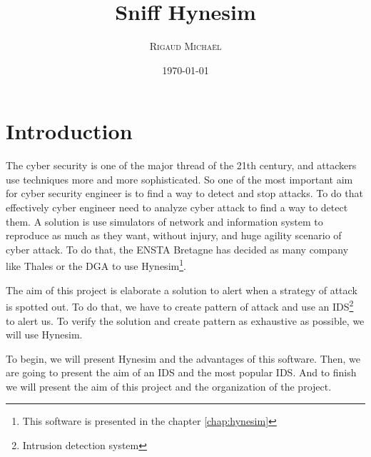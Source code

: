 \documentclass[a4paper, 11pt, oneside, oldfontcommands]{memoir}
\title{Sniff Hynesim}
\author{\textsc{Rigaud Michaël}}
\date{\today}
\newcounter{th}[chapter]
\begin{document}
\maketitle
\thispagestyle{empty}
\newpage

\tableofcontents



\chapter*{Introduction}

The cyber security is one of the major thread of the 21th century, and attackers use techniques more and more
sophisticated. So one of the most important aim for cyber security engineer is to find a way to detect and stop
attacks. To do that effectively cyber engineer need to analyze cyber attack to find a way to detect them. A
solution is use simulators of network and information system to reproduce as much as they want, without injury, and
huge agility scenario of cyber attack. To do that, the ENSTA Bretagne has decided as many company like Thales or
the DGA to use Hynesim\footnote{This software is presented in the chapter \ref{chap:hynesim}}.

The aim of this project is elaborate a solution to alert when a strategy of attack is spotted out. To do that, we
have to create pattern of attack and use an IDS\footnote{Intrusion detection system} to alert us. To verify the
solution and create pattern as exhaustive as possible, we will use Hynesim.

To begin, we will present Hynesim and the advantages of this software. Then, we are going to present the aim of an
IDS and the most popular IDS. And to finish we will present the aim of this project and the organization of the
project.

\newpage


%
%
\end{document}
